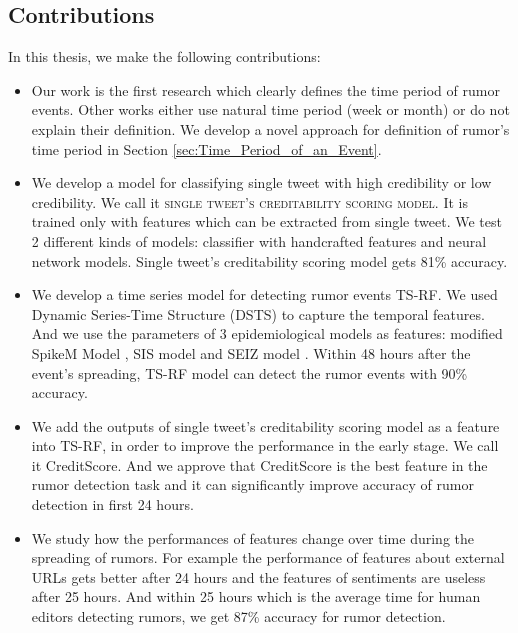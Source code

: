  \newpage
 \subsection{Contributions}
In this thesis, we make the following contributions:

\begin{itemize}
	\item Our work is the first research which clearly defines the time period of rumor events. Other works either use natural time period (week or month) or do not explain their definition. We develop a novel approach for definition of rumor's time period in Section \ref{sec:Time_Period_of_an_Event}. 
	\item We develop a model for classifying single tweet with high credibility or low credibility. We call it \textsc{single tweet's creditability scoring model}. It is trained only with features which can be extracted from single tweet. We test 2 different kinds of models: classifier with handcrafted features and neural network models.   Single tweet's creditability scoring model gets 81\% accuracy.

 	\item We develop a time series model for detecting rumor events TS-RF. We used Dynamic Series-Time Structure (DSTS)\cite{liu2015real} to capture the temporal  features. And we use the parameters of 3 epidemiological models as features: modified SpikeM Model \cite{kwon2013prominent}, SIS model and SEIZ model \cite{jin2013epidemiological}. Within 48 hours after the event's spreading, TS-RF model can detect the rumor events with 90\% accuracy. 
 	\item  We add the outputs of single tweet's creditability scoring model as a feature into TS-RF, in order to improve the performance in the early stage. We call it CreditScore. And we approve that CreditScore is the best feature in the rumor detection task and it can significantly improve accuracy of rumor detection in first 24 hours.

 	\item We study how the performances of features change over time during the spreading of rumors. For example the performance of features about external URLs gets better after 24 hours and the features of sentiments are useless after 25 hours. And within 25 hours which is the average time for human editors detecting rumors, we get 87\% accuracy for rumor detection.

 \end{itemize}
 
